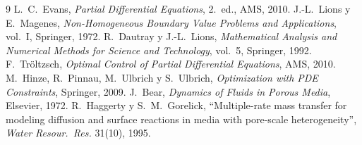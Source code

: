 \documentclass[11pt]{article}
\numberwithin{equation}{section}
\theoremstyle{remark}
\begin{document}
\begin{thebibliography}{9}
 L.~C.~Evans, \emph{Partial Differential Equations}, 2.\textordmasculine\ ed., AMS, 2010.
 J.-L.~Lions y E.~Magenes, \emph{Non-Homogeneous Boundary Value Problems and Applications}, vol.~I, Springer, 1972.
 R.~Dautray y J.-L.~Lions, \emph{Mathematical Analysis and Numerical Methods for Science and Technology}, vol.~5, Springer, 1992.
 F.~Tr\"oltzsch, \emph{Optimal Control of Partial Differential Equations}, AMS, 2010.
 M.~Hinze, R.~Pinnau, M.~Ulbrich y S.~Ulbrich, \emph{Optimization with PDE Constraints}, Springer, 2009.
 J.~Bear, \emph{Dynamics of Fluids in Porous Media}, Elsevier, 1972.
 R.~Haggerty y S.~M.~Gorelick, ``Multiple-rate mass transfer for modeling diffusion and surface reactions in media with pore-scale heterogeneity'', \emph{Water Resour.\ Res.} 31(10), 1995.
\end{thebibliography}
\end{document}
